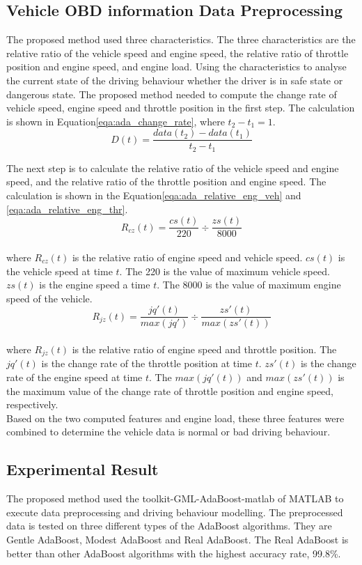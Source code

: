\subsection{Vehicle OBD information Data Preprocessing}
The proposed method used three characteristics. The three characteristics are the relative ratio of the vehicle speed and engine speed, the relative ratio of throttle position and engine speed, and engine load. Using the characteristics to analyse the current state of the driving behaviour whether the driver is in safe state or dangerous state. The proposed method needed to compute the change rate of vehicle speed, engine speed and throttle position in the first step. The calculation is shown in Equation\eqref{eqa:ada_change_rate}, where $t_{2} - t_{1} = 1$.\\
\begin{equation}
\label{eqa:ada_change_rate}
D(t) = \dfrac{data(t_{2})-data(t_{1})}{t_{2}-t_{1}}
\end{equation}

The next step is to calculate the relative ratio of the vehicle speed and engine speed, and the relative ratio of the throttle position and engine speed. The calculation is shown in the Equation\eqref{eqa:ada_relative_eng_veh} and \eqref{eqa:ada_relative_eng_thr}. \\
\begin{equation}
\label{eqa:ada_relative_eng_veh}
R_{cz}(t) = \dfrac{cs(t)}{220} \div \dfrac{zs(t)}{8000}
\end{equation}
\\
where $R_{cz}(t)$ is the relative ratio of engine speed and vehicle speed. $cs(t)$ is the vehicle speed at time $t$. The 220 is the value of maximum vehicle speed. $zs(t)$ is the engine speed a time $t$. The 8000 is the value of maximum engine speed of the vehicle.\\

\begin{equation}
\label{eqa:ada_relative_eng_thr}
R_{jz}(t) = \dfrac{jq'(t)}{max(jq')} \div \dfrac{zs'(t)}{max(zs'(t))}
\end{equation}
\\
where $R_{jz}(t)$ is the relative ratio of engine speed and throttle position. The $jq'(t)$ is the change rate of the throttle position at time $t$. $zs'(t)$ is the change rate of the engine speed at time $t$. The $max(jq'(t))$ and $max(zs'(t))$ is the maximum value of the change rate of throttle position and engine speed, respectively.\\

Based on the two computed features and engine load, these three features were combined to determine the vehicle data is normal or bad driving behaviour.

\subsection{Experimental Result}
The proposed method used the toolkit-GML-AdaBoost-matlab of MATLAB to execute data preprocessing and driving behaviour modelling. The preprocessed data is tested on three different types of the AdaBoost algorithms. They are Gentle AdaBoost, Modest AdaBoost and Real AdaBoost. The Real AdaBoost is better than other AdaBoost algorithms with the highest accuracy rate, 99.8\%.